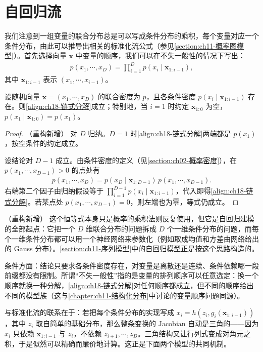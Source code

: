 \documentclass[../../main.tex]{subfiles}
\begin{document}
\section{自回归流}\label{section:ch18-自回归流}

我们注意到一组变量的联合分布总是可以写成条件分布的乘积，每个变量对应一个条件分布，由此可以推导出相关的标准化流公式（参见\cref{section:ch11-概率图模型}）。首先选择向量 $\bm{x}$ 中变量的顺序，我们可以在不失一般性的情况下写出：
\begin{align}
  p(x_1,\cdots,x_D)=\prod_{i=1}^{D}p(x_i\mid\bm{x}_{1:i-1}),\label{align:ch18-链式分解}
\end{align}
其中 $\bm{x}_{1:i-1}$ 表示 $(x_1,\cdots,x_{i-1})$。

\begin{proposition}[条件分布的链式分解]\label{proposition:ch18-链式分解}
设随机向量 $\bm{x}=(x_1,\cdots,x_D)$ 的联合密度为 $p$，且各条件密度 $p(x_i\mid\bm{x}_{1:i-1})$ 存在。则\eqref{align:ch18-链式分解}成立；特别地，当 $i=1$ 时约定 $\bm{x}_{1:0}$ 为空，$p(x_1\mid\bm{x}_{1:0})=p(x_1)$。
\end{proposition}

\begin{proof}（重构新增）
对 $D$ 归纳。$D=1$ 时\eqref{align:ch18-链式分解}两端都是 $p(x_1)$，按空条件的约定成立。

设结论对 $D-1$ 成立。由条件密度的定义（见\cref{section:ch02-概率密度}），在 $p(x_1,\cdots,x_{D-1})>0$ 的点处有
\begin{align*}
  p(x_1,\cdots,x_D)=p(x_D\mid\bm{x}_{1:D-1})\,p(x_1,\cdots,x_{D-1}).
\end{align*}
右端第二个因子由归纳假设等于 $\prod_{i=1}^{D-1}p(x_i\mid\bm{x}_{1:i-1})$，代入即得\eqref{align:ch18-链式分解}。若某点处 $p(x_1,\cdots,x_{D-1})=0$，则左端也为零，等式仍成立。
\end{proof}

\begin{remark}（重构新增）
这个恒等式本身只是概率的乘积法则反复使用，但它是自回归建模的全部起点：它把一个 $D$ 维联合分布的问题拆成 $D$ 个一维条件分布的问题，而每个一维条件分布都可以用一个神经网络来参数化（例如取成均值和方差由网络给出的 Gauss 分布）。\cref{section:ch11-序列模型}中的自回归模型正是按这个思路构造的。

条件方面：结论只要求各条件密度存在，对变量是离散还是连续、条件依赖哪一段前缀都没有限制。所谓“不失一般性”指的是变量的排列顺序可以任意选定：换一个顺序就换一种分解，\eqref{align:ch18-链式分解}对任何顺序都成立，但不同的顺序给出不同的模型族（这与\cref{chapter:ch11-结构化分布}中讨论的变量顺序问题同源）。

与标准化流的联系在于：若把每个条件分布的实现写成 $x_i=h(z_i,g_i(\bm{x}_{1:i-1}))$，其中 $z_i$ 取自简单的基础分布，那么整条变换的 Jacobian 自动是三角的——因为 $x_i$ 只依赖 $\bm{x}_{1:i-1}$ 与 $z_i$，不依赖 $z_{i+1},\cdots,z_D$。三角结构又让行列式变成对角元之积，于是似然可以精确而廉价地计算。这正是下面两个模型的共同机制。
\end{remark}
\end{document}
